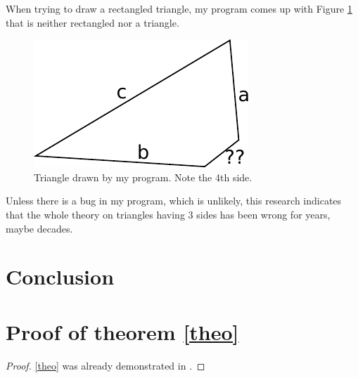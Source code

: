 \documentclass{thesisreport}
\begin{document}
 When trying to draw a rectangled triangle, my program comes up with Figure \ref{triangle2} that is neither rectangled nor a triangle.
 
  \begin{figure}[h]\centering
  \includegraphics[width=.5\linewidth]{triangle2}
  \caption{Triangle drawn by my program. Note the 4th side.} \label{triangle2}
 \end{figure}
 
Unless there is a bug in my program, which is unlikely, this research indicates that the whole theory on triangles having 3 sides has been wrong for years, maybe decades.
 
 \chapter*{Conclusion}
 
 
 
 
 
 \appendix	
 
 \chapter{Proof of theorem \ref{theo}}
 \label{sec:prooftheorem}
 
 
 \begin{proof}
\eqref{theo} was already demonstrated in \cite{euclides300}.
\end{proof}
 
 
 
 
 
 
 
\end{document}
